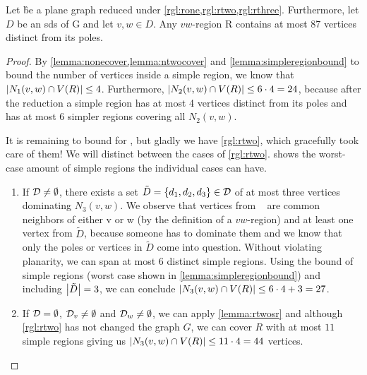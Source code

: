 \begin{lemma}\label{lemma:inside}
    Let \G be a plane graph reduced under \cref{rgl:rone,rgl:rtwo,rgl:rthree}. Furthermore, let $D$ be an sds of G and let $v,w \in D$. Any $vw$-region R contains at most 87 vertices distinct from its poles.
\end{lemma}
\begin{proof} 
    By \cref{lemma:nonecover,lemma:ntwocover} and \cref{lemma:simpleregionbound} to bound the number of vertices inside a simple region, we know that $\abs{N_1(v,w) \cap V(R)} \leq 4$. 
    Furthermore, $\abs{N_2(v,w) \cap V(R)} \leq 6 \cdot 4 = 24$, because after the reduction a simple region has at most 4 vertices distinct from its poles and has at most 6 simpler regions covering all $N_2(v, w)$.
    
    It is remaining to bound for \nthi, but gladly we have \cref{rgl:rtwo}, which gracefully took care of them! We will distinct between the cases of \cref{rgl:rtwo}. 
     shows the worst-case amount of simple regions the individual cases can have.
    
    \begin{caseofz}

        \begin{enumerate}
            \item If $\mathcal{D} \neq \emptyset$, there exists a set $\tilde D = \{d_1,d_2,d_3\} \in \mathcal{D}$ of at most three vertices dominating $N_3(v,w)$. We observe that vertices from \nthi~ are common neighbors of either v or w (by the definition of a $vw$-region) and at least one vertex from $\tilde D$, because someone has to dominate them and we know that only the poles or vertices in $\tilde D$ come into question.
            Without violating planarity, we can span at most 6 distinct simple regions. Using the bound of simple regions (worst case shown in \cref{lemma:simpleregionbound}) and including $\abs{\tilde D} = 3$, we can conclude $\abs{N_3(v,w) \cap V(R)} \leq 6 \cdot 4 + 3 = 27$.
            \item If $\mathcal{D} = \emptyset$, $\mathcal{D}_{v} \neq \emptyset$ and $\mathcal{D}_{w} \neq \emptyset$, we can apply \cref{lemma:rtwosr} and although \cref{rgl:rtwo} has not changed the graph $G$, we can cover $R$ with at most $11$ simple regions giving us $\abs{N_3(v,w) \cap V(R)} \leq 11 \cdot 4 = 44$ vertices.
        \end{enumerate}
        

\end{caseofz}
\end{proof}
